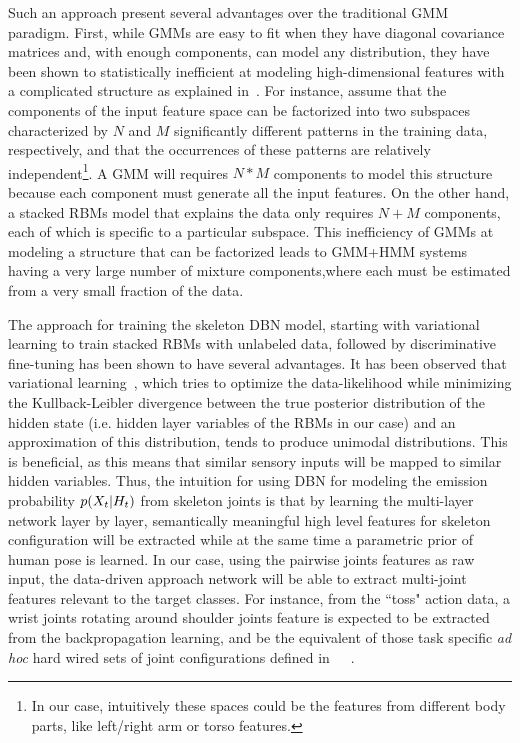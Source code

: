 Such an approach present several advantages over the traditional GMM paradigm.
%
First, while  GMMs are easy to fit when they have diagonal covariance matrices and, with enough components,
can model any distribution, they have been shown to statistically inefficient at modeling high-dimensional features
with a complicated structure as explained in~\cite{mohamed2012acoustic}.
%
For instance, assume that the components of the input feature space can be factorized into two subspaces
characterized by  $N$  and $M$ significantly different  patterns in the training data, respectively, and that the occurrences
of these patterns are relatively independent\footnote{In our case, intuitively these spaces could be the  features from different body parts,
like left/right arm or torso features.}.
%
A GMM will requires $N*M$ components to model this structure because each component must generate all the input features.
%
On the other hand, a stacked RBMs model that  explains the data only requires $N+M$ components, each of which is specific to a particular subspace.
%
This inefficiency of GMMs at modeling a structure that can be factorized leads to GMM+HMM systems having
a very large number of mixture components,where each must be estimated from a very small fraction of the data.


The approach for training the skeleton DBN model, starting with variational learning to train stacked RBMs with unlabeled data, followed by discriminative fine-tuning \cite{salakhutdinov2009learning} has been shown to have several advantages.
%
It has been observed that  variational learning~\cite{hinton2006fast},
which tries to optimize the data-likelihood while minimizing the Kullback-Leibler divergence between
the true posterior distribution of the hidden state (i.e. hidden layer variables of the RBMs  in our case)
and an approximation of this distribution, tends to produce unimodal distributions.
%
This is beneficial, as this means that similar sensory inputs will be mapped to  similar hidden variables.
%
Thus, the intuition for using DBN  for modeling the emission probability $p(X_t|H_t)$
from skeleton joints  is that by learning the multi-layer network layer by layer,
semantically meaningful high level features for skeleton configuration will be extracted while at the same
time a  parametric prior of human pose is learned.
%
%
In our case, using the pairwise joints features as raw input, the data-driven approach network will be able to extract multi-joint features relevant to the target classes.
For instance, from  the ``toss" action data, a wrist joints rotating around shoulder joints feature is expected to
be extracted from the backpropagation  learning, and be the equivalent of those task specific \emph{ad hoc} hard wired sets
of joint configurations defined in~\cite{chaudhry2013bio}~\cite{muller2006motion}\cite{nowozin2012action}~\cite{ofli2013sequence}.

